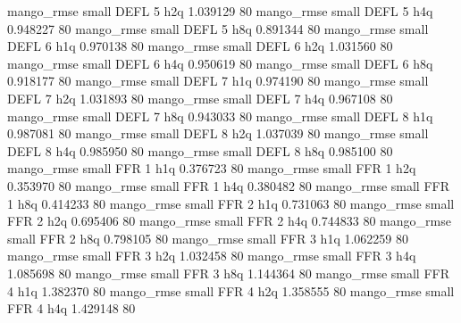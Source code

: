        mango_rmse      small     DEFL                 5                  h2q 1.039129 80
       mango_rmse      small     DEFL                 5                  h4q 0.948227 80
       mango_rmse      small     DEFL                 5                  h8q 0.891344 80
       mango_rmse      small     DEFL                 6                  h1q 0.970138 80
       mango_rmse      small     DEFL                 6                  h2q 1.031560 80
       mango_rmse      small     DEFL                 6                  h4q 0.950619 80
       mango_rmse      small     DEFL                 6                  h8q 0.918177 80
       mango_rmse      small     DEFL                 7                  h1q 0.974190 80
       mango_rmse      small     DEFL                 7                  h2q 1.031893 80
       mango_rmse      small     DEFL                 7                  h4q 0.967108 80
       mango_rmse      small     DEFL                 7                  h8q 0.943033 80
       mango_rmse      small     DEFL                 8                  h1q 0.987081 80
       mango_rmse      small     DEFL                 8                  h2q 1.037039 80
       mango_rmse      small     DEFL                 8                  h4q 0.985950 80
       mango_rmse      small     DEFL                 8                  h8q 0.985100 80
       mango_rmse      small      FFR                 1                  h1q 0.376723 80
       mango_rmse      small      FFR                 1                  h2q 0.353970 80
       mango_rmse      small      FFR                 1                  h4q 0.380482 80
       mango_rmse      small      FFR                 1                  h8q 0.414233 80
       mango_rmse      small      FFR                 2                  h1q 0.731063 80
       mango_rmse      small      FFR                 2                  h2q 0.695406 80
       mango_rmse      small      FFR                 2                  h4q 0.744833 80
       mango_rmse      small      FFR                 2                  h8q 0.798105 80
       mango_rmse      small      FFR                 3                  h1q 1.062259 80
       mango_rmse      small      FFR                 3                  h2q 1.032458 80
       mango_rmse      small      FFR                 3                  h4q 1.085698 80
       mango_rmse      small      FFR                 3                  h8q 1.144364 80
       mango_rmse      small      FFR                 4                  h1q 1.382370 80
       mango_rmse      small      FFR                 4                  h2q 1.358555 80
       mango_rmse      small      FFR                 4                  h4q 1.429148 80
